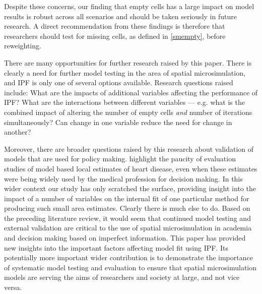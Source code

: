 \documentclass[a4paper,10pt]{article}
\begin{document}
Despite these concerns, our finding that empty cells has a large impact on model
results is robust across all scenarios and should be taken seriously in future research.
A direct recommendation from these findings is therefore that researchers should
test for missing cells, as defined in \cref{smempty}, before reweighting.

There are many opportunities for further research raised by this paper.
There is clearly a need for further model testing in the area of spatial microsimulation,
and IPF is only one of several options available. Research questions raised include:
What are the impacts of additional variables affecting the performance of IPF?
What are the interactions between different variables --- e.g. what is the
combined impact of altering the number of empty cells \emph{and} number of
iterations simultaneously? Can change in one variable reduce the need for
change in another?

Moreover, there are broader questions raised by this research about validation
of models that are used for policy making. \citet{Scarborough2009} highlight the
paucity of evaluation studies of model based local estimates of heart disease,
even when these estimates were being widely used by the medical profession for
decision making. In this wider context our study has only scratched the surface,
providing insight into the impact of a number of variables on the internal fit of
one particular method for producing such small area estimates. Clearly there is
much else to do. Based on the preceding literature review, it would seem that
continued model testing and external validation are critical to the use of spatial
microsimulation in academia and decision making based on imperfect information.
This paper has provided new insights into the important factors affecting model
fit using IPF. Its potentially more important
wider contribution is to demonstrate the importance of
systematic model testing and evaluation to ensure that spatial microsimulation
models are serving the aims of researchers and society at large, and not vice versa.




\end{document}
